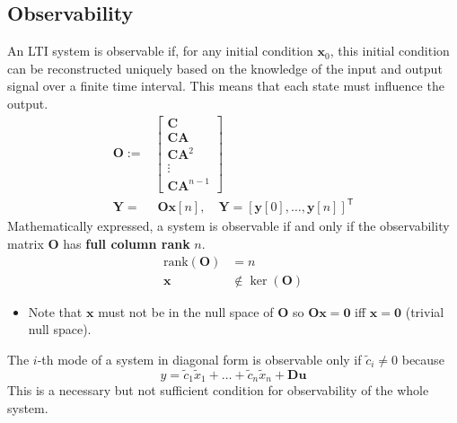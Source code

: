 \subsection{Observability}

An LTI system is observable if, for any initial condition $\mathbf{x}_0$, this initial condition can be reconstructed uniquely based on the knowledge of the input and output signal over a finite time interval. This means that each state must influence the output.
\noindent\begin{align*}
    \mathbf{O} := & \begin{bmatrix}
                        \mathbf{C}    \\
                        \mathbf{CA}   \\
                        \mathbf{CA}^2 \\
                        \vdots        \\
                        \mathbf{CA}^{n-1}
                    \end{bmatrix}                                                                                   \\
    \mathbf{Y} =  & \; \mathbf{Ox}[n],\quad \mathbf{Y}={\left[\mathbf{y}[0],\ldots, \mathbf{y}[n]\right]}^{\mathsf{T}}
\end{align*}
Mathematically expressed, a system is observable if and only if the observability matrix $\mathbf{O}$ has \textbf{full column rank} $n$.
\begin{align*}
    \text{rank}(\mathbf{O}) & = n                     \\
    \mathbf{x}              & \notin \ker(\mathbf{O})
\end{align*}

\newpar{}
\begin{itemize}
    \item Note that $\mathbf{x}$ must not be in the null space of $\mathbf{O}$ so $\mathbf{Ox}=\mathbf{0}$ iff $\mathbf{x}=\mathbf{0}$ (trivial null space). %
\end{itemize}


The $i$-th mode of a system in diagonal form is observable only if $\tilde{c}_i \neq 0$ because
\begin{equation*}
    y=\tilde{c}_1\tilde{x}_1+\ldots+\tilde{c}_n\tilde{x}_n+\mathbf{Du} %
\end{equation*}
This is a necessary but not sufficient condition for observability of the whole system.


